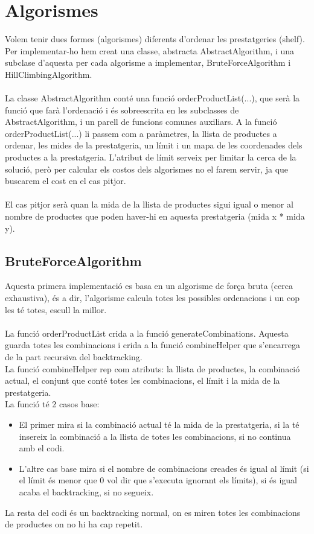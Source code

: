 \documentclass[a4paper, t]{article}
\begin{document}
\section{Algorismes}

Volem tenir dues formes (algorismes) diferents d’ordenar les prestatgeries (shelf). Per implementar-ho hem creat una classe, abstracta AbstractAlgorithm, i una subclase d’aquesta per cada algorisme a implementar, BruteForceAlgorithm i HillClimbingAlgorithm.
\\ \\
La classe AbstractAlgorithm conté una funció orderProductList(...), que serà la funció que farà l’ordenació i és sobreescrita en les subclasses de AbstractAlgorithm, i un parell de funcions comunes auxiliars. A la funció orderProductList(...) li passem com a paràmetres, la llista de productes a ordenar, les mides de la prestatgeria, un límit i un mapa de les coordenades dels productes a la prestatgeria. L'atribut de límit serveix per limitar la cerca de la solució, però per calcular els costos dels algorismes no el farem servir, ja que buscarem el cost en el cas pitjor.
\\ \\
El cas pitjor serà quan la mida de la llista de productes sigui igual o menor al nombre de productes que poden haver-hi en aquesta prestatgeria (mida x * mida y).

\subsection{BruteForceAlgorithm}
Aquesta primera implementació es basa en un algorisme de força bruta (cerca exhaustiva), és a dir, l'algorisme calcula totes les possibles ordenacions i un cop les té totes, escull la millor.
\\ \\
La funció orderProductList crida a la funció generateCombinations. Aquesta guarda totes les combinacions i crida a la funció combineHelper que s’encarrega de la part recursiva del backtracking.
\\
La funció combineHelper rep com atributs: la llista de productes, la combinació actual, el conjunt que conté totes les combinacions, el límit i la mida de la prestatgeria.
\\
\noindent La funció té 2 casos base:
\begin{itemize}
    \item El primer mira si la combinació actual té la mida de la prestatgeria, si la té insereix la combinació a la llista de totes les combinacions, si no continua amb el codi.
    \item L’altre cas base mira si el nombre de combinacions creades és igual al límit (si el límit és menor que 0 vol dir que s’executa ignorant els límits), si és igual acaba el backtracking, si no segueix.
\end{itemize}
La resta del codi és un backtracking normal, on es miren totes les combinacions de productes on no hi ha cap repetit.
\end{document}
